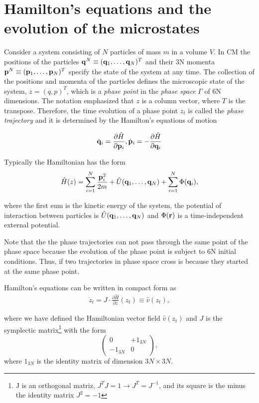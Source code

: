 \documentclass[b5paper,openright,11pt]{book}
\begin{document}
\section{Hamilton's equations and the evolution of the microstates}
Consider a system consisting of $N$ particles of mass $m$ in a volume $V$. 
In CM the positions of the particles ${\bf q}^N\equiv ({\bf q}_1,\dots,{\bf q}_N)^T$ and their 3N momenta ${\bf p}^N\equiv ({\bf p}_1,\dots,{\bf p}_N)^T$ specify the state of the system at any time. 
The collection of the positions and momenta of the particles defines the microscopic state of the system, $z=(q,p)^T$, which is a {\it phase point} in the {\it phase space} $\Gamma$ of 6N dimensions. 
The notation emphasized that $z$ is a column vector, where $T$ is the transpose. 
Therefore, the time evolution of a phase point $z_t$ is called the {\it phase trajectory} and it is determined by the Hamilton's equations of motion

\begin{equation}
    \dot{{\bf q}}_i = \frac{\partial \hat{H}}{\partial {\bf p}_i}, \dot{{\bf p}}_i = -\frac{\partial \hat{H}}{\partial {\bf q}_i}
  \label{HamiltonEqs}
\end{equation}

Typically the Hamiltonian has the form
\begin{align}
    \hat{H}(z) = \sum_{i=1}^{N}\frac{{\bf p}_i^2}{2m}+\hat{U}({\bf q}_1,\dots,{\bf q}_N)+\sum_{i=1}^{N}\Phi({\bf q}_i),
\end{align}

where the first sum is the kinetic energy of the system, the potential of interaction
between particles is $\hat{U}({\bf q}_1,\dots,{\bf q}_N)$ and $\Phi({\bf r})$ is a time-independent external potential. 

Note that the the phase trajectories can not pass through the same point of the phase space because the evolution of the phase point is subject to 6N initial conditions. 
Thus, if two trajectories in phase space cross is because they started at the same phase point.  

Hamilton's equations can be written in compact form as
\begin{align}
  \dot{z}_t = J\cdot\frac{\partial\hat{H}}{\partial{z}}(z_t)\equiv \hat{v}(z_t),
  \label{compactHamiltonEqs}
\end{align}

where we have defined the Hamiltonian vector field $\hat{v}(z_t)$ and $J$ is the symplectic matrix\footnote{J is an orthogonal matriz, $J^TJ=1\to J^T = J^{-1}$, and its square is the minus the identity matrix $J^2=-1$} with the form
$$
\begin{pmatrix} 
  0 & +1_{3N} \\
  -1_{3N} & 0 
\end{pmatrix},
$$
where $1_{3N}$ is the identity matrix of dimension $3N \times 3N$.
\end{document}
